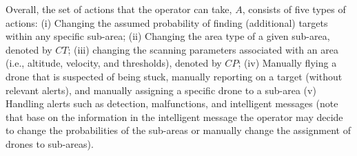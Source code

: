 





Overall, the set of actions that the operator can take, $A$, consists of five types of actions: 
(i) Changing the assumed probability of finding (additional) targets within any specific sub-area; (ii) Changing the area type of a given sub-area, denoted by $CT$; (iii) changing the scanning parameters associated with an area (i.e., altitude, velocity, and thresholds), denoted by $CP$;  (iv) Manually flying a drone that is suspected of being stuck, manually reporting on a target (without relevant alerts), and manually assigning a specific drone to a sub-area (v) Handling alerts such as detection, malfunctions, and intelligent messages (note that base on the information in the intelligent message the operator may decide to change the probabilities of the sub-areas or manually change the assignment of drones to sub-areas).

